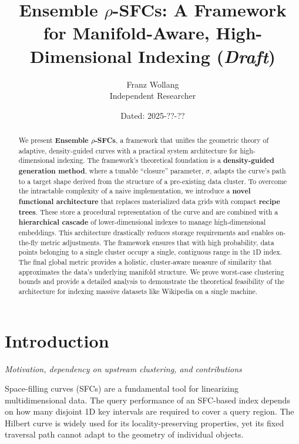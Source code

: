 \documentclass[11pt]{article}
\title{Ensemble $\rho$-SFCs: A Framework for Manifold-Aware, High-Dimensional Indexing (\textit{Draft})}
\author{Franz Wollang\\ \small Independent Researcher}
\date{\small Dated: 2025-??-??}
\newcommand{\sectionsubtitle}[1]{\vspace{-0.25em}\noindent\textit{#1}\par\vspace{0.75em}}
\begin{document}
\maketitle

\begin{center}
\setlength{\fboxsep}{8pt}%
\end{center}
\vspace{1em}

\begin{abstract}
We present \textbf{Ensemble $\rho$-SFCs}, a framework that unifies the geometric theory of adaptive, density-guided curves with a practical system architecture for high-dimensional indexing. The framework's theoretical foundation is a \textbf{density-guided generation method}, where a tunable ``closure'' parameter, $\sigma$, adapts the curve's path to a target shape derived from the structure of a pre-existing data cluster. To overcome the intractable complexity of a naive implementation, we introduce a \textbf{novel functional architecture} that replaces materialized data grids with compact \textbf{recipe trees}. These store a procedural representation of the curve and are combined with a \textbf{hierarchical cascade} of lower-dimensional indexes to manage high-dimensional embeddings. This architecture drastically reduces storage requirements and enables on-the-fly metric adjustments. The framework ensures that with high probability, data points belonging to a single cluster occupy a single, contiguous range in the 1D index. The final global metric provides a holistic, cluster-aware measure of similarity that approximates the data's underlying manifold structure. We prove worst-case clustering bounds and provide a detailed analysis to demonstrate the theoretical feasibility of the architecture for indexing massive datasets like Wikipedia on a single machine.
\end{abstract}

\section{Introduction}
\label{sec:introduction}
\sectionsubtitle{Motivation, dependency on upstream clustering, and contributions}

Space-filling curves (SFCs) are a fundamental tool for linearizing multidimensional data. The query performance of an SFC-based index depends on how many disjoint 1D key intervals are required to cover a query region. The Hilbert curve is widely used for its locality-preserving properties, yet its fixed traversal path cannot adapt to the geometry of individual objects.
\end{document}
